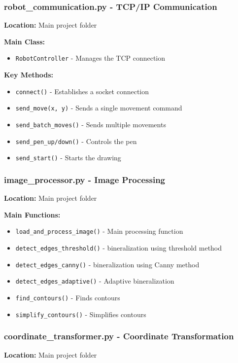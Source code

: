 \documentclass[a4paper,12pt]{article}
\begin{document}
\subsubsection{robot\_communication.py - TCP/IP Communication}
\textbf{Location:} Main project folder

\textbf{Main Class:}
\begin{itemize}
\item \texttt{RobotController} - Manages the TCP connection
\end{itemize}

\textbf{Key Methods:}
\begin{itemize}
\item \texttt{connect()} - Establishes a socket connection
\item \texttt{send\_move(x, y)} - Sends a single movement command
\item \texttt{send\_batch\_moves()} - Sends multiple movements
\item \texttt{send\_pen\_up/down()} - Controls the pen
\item \texttt{send\_start()} - Starts the drawing
\end{itemize}

\subsubsection{image\_processor.py - Image Processing}
\textbf{Location:} Main project folder

\textbf{Main Functions:}
\begin{itemize}
\item \texttt{load\_and\_process\_image()} - Main processing function
\item \texttt{detect\_edges\_threshold()} - bineralization using threshold method
\item \texttt{detect\_edges\_canny()} - bineralization using Canny method
\item \texttt{detect\_edges\_adaptive()} - Adaptive bineralization
\item \texttt{find\_contours()} - Finds contours
\item \texttt{simplify\_contours()} - Simplifies contours
\end{itemize}

\subsubsection{coordinate\_transformer.py - Coordinate Transformation}
\textbf{Location:} Main project folder
\end{document}
